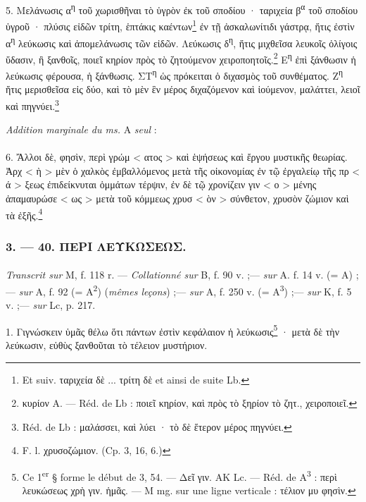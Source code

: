 \documentclass[landscape, a4paper, 11pt, oneside, polutonikogreek, french]{article}
\begin{document}
5. Μελάνωσις α\textsuperscript{η} τοῦ χωρισθῆναι τὸ ὑγρὸν ἐκ τοῦ σποδίου · ταριχεία β\textsuperscript{α} τοῦ σποδίου ὑγροῦ · πλύσις εἰδῶν τρίτη, ἑπτάκις καέντων\footnote{Et suiv. ταριχεία δὲ ... τρίτη δὲ et ainsi de suite Lb.} ἐν τῇ ἀσκαλωνίτιδι γάστρᾳ, ἥτις ἐστὶν α\textsuperscript{η} λεύκωσις καὶ ἀπομελάνωσις τῶν εἰδῶν. Λεύκωσις δ\textsuperscript{η}, ἥτις μιχθεῖσα λευκοῖς ὀλίγοις ὕδασιν, ἢ ξανθοῖς, ποιεῖ κηρίον πρὸς τὸ ζητούμενον χειροποητοῖς.\footnote{κυρίον A. --- Réd. de Lb : ποιεῖ κηρίον, καὶ πρὸς τὸ ξηρίον τὸ ζητ., χειροποιεῖ.} Ε\textsuperscript{η} ἐπὶ ξάνθωσιν ἡ λεύκωσις φέρουσα, ἡ ξάνθωσις. ΣΤ\textsuperscript{η} ὡς πρόκειται ὁ διχασμὸς τοῦ συνθέματος. Ζ\textsuperscript{η} ἥτις μερισθεῖσα εἰς δύο, καὶ τὸ μὲν ἓν μέρος διχαζόμενον καὶ ἰούμενον, μαλάττει, λειοῖ καὶ πηγνύει.\footnote{Réd. de Lb : μαλάσσει, καὶ λύει · τὸ δὲ ἕτερον μέρος πηγνύει.}
\begin{center}
\emph{Addition marginale du ms.} A \emph{seul} :
\end{center}
\paragraph{}
6. Ἄλλοι δὲ, φησὶν, περὶ γρώμ < ατος > καὶ ἑψήσεως καὶ ἔργου μυστικῆς θεωρίας. Ἀρχ < ὴ > μὲν ὁ χαλκὸς ἐμβαλλόμενος μετὰ τῆς οἰκονομίας ἐν τῷ ἐργαλείῳ τῆς πρ < ά > ξεως ἐπιδείκνυται ὁμμάτων τέρψιν, ἐν δὲ τῷ χρονίζειν γιν < ο > μένης ἀπαμαυρώσε < ως > μετὰ τοῦ κόμμεως χρυσ < ὸν > σύνθετον, χρυσὸν ζώμιον καὶ τὰ ἐξῆς.\footnote{F. l. χρυσοζώμιον. (Cp. 3, 16, 6.)}

\bigskip
\centerline{\EightStarTaper}
\centerline{\EightStarTaper\EightStarTaper}
\bigskip

\subsubsection{3. --- 40. ΠΕΡΙ ΛΕΥΚΩΣΕΩΣ.}
\paragraph{}
\emph{Transcrit sur} M, f. 118 r. --- \emph{Collationné sur} B, f. 90 v. ;--- \emph{sur} A. f. 14 v. (= A) ;--- \emph{sur} A, f. 92 (= A\textsuperscript{2}) (\emph{mêmes leçons}) ;--- \emph{sur} A, f. 250 v. (= A\textsuperscript{3}) ;--- \emph{sur} K, f. 5 v. ;--- \emph{sur} Lc, p. 217.

\bigskip

1. Γιγνώσκειν ὑμᾶς θέλω ὅτι πάντων ἐστὶν κεφάλαιον ἡ λεύκωσις\footnote{Ce 1\textsuperscript{er} § forme le début de 3, 54. --- Δεῖ γιν. AK Lc. --- Réd. de A\textsuperscript{3} : περὶ λευκώσεως χρὴ γιν. ἡμᾶς. --- M mg. sur une ligne verticale : τέλιον μυ φησὶν.} · μετὰ δὲ τὴν λεύκωσιν, εὐθὺς ξανθοῦται τὸ τέλειον μυστήριον.
\end{document}
